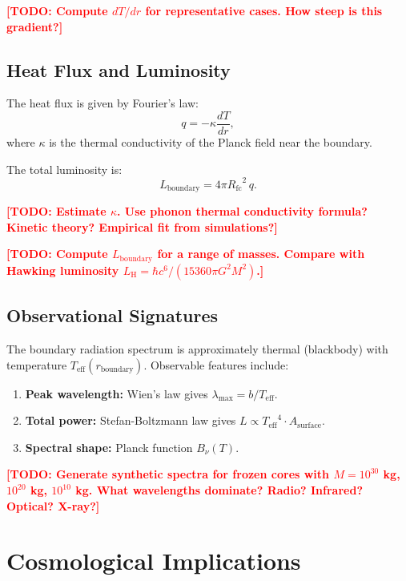 \documentclass[11pt,a4paper]{article}
\newcommand{\Teff}{\ensuremath{T_{\mathrm{eff}}}}
\newcommand{\Rfc}{\ensuremath{R_{\mathrm{fc}}}}
\newcommand{\TODO}[1]{\textcolor{red}{\textbf{[TODO: #1]}}}
\theoremstyle{definition}
\theoremstyle{remark}
\begin{document}
\TODO{Compute $dT/dr$ for representative cases. How steep is this gradient?}

\subsection{Heat Flux and Luminosity}
\label{sec:heat_flux}

The heat flux is given by Fourier's law:
\begin{equation}
q = -\kappa \frac{dT}{dr},
\end{equation}
where $\kappa$ is the thermal conductivity of the Planck field near the boundary.

The total luminosity is:
\begin{equation}
L_{\mathrm{boundary}} = 4\pi \Rfc^2 \, q.
\label{eq:L_boundary}
\end{equation}

\TODO{Estimate $\kappa$. Use phonon thermal conductivity formula? Kinetic theory? Empirical fit from simulations?}

\TODO{Compute $L_{\mathrm{boundary}}$ for a range of masses. Compare with Hawking luminosity $L_{\mathrm{H}} = \hbar c^6/(15360\pi G^2 M^2)$.}

\subsection{Observational Signatures}
\label{sec:observational_signatures}

The boundary radiation spectrum is approximately thermal (blackbody) with temperature $\Teff(r_{\mathrm{boundary}})$. Observable features include:
\begin{enumerate}[leftmargin=*, itemsep=0.3em]
\item \textbf{Peak wavelength:} Wien's law gives $\lambda_{\max} = b/\Teff$.
\item \textbf{Total power:} Stefan-Boltzmann law gives $L \propto \Teff^4 \cdot A_{\mathrm{surface}}$.
\item \textbf{Spectral shape:} Planck function $B_\nu(T)$.
\end{enumerate}

\TODO{Generate synthetic spectra for frozen cores with $M = 10^{30}$ kg, $10^{20}$ kg, $10^{10}$ kg. What wavelengths dominate? Radio? Infrared? Optical? X-ray?}

\section{Cosmological Implications}
\label{sec:cosmology}
\end{document}
